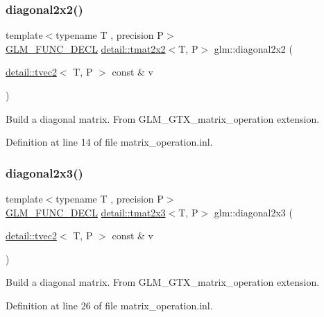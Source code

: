 \subsubsection{\texorpdfstring{diagonal2x2()}{diagonal2x2()}}
{\footnotesize\ttfamily template$<$typename T , precision P$>$ \\
\hyperlink{setup_8hpp_ab2d052de21a70539923e9bcbf6e83a51}{G\+L\+M\+\_\+\+F\+U\+N\+C\+\_\+\+D\+E\+CL} \hyperlink{structglm_1_1detail_1_1tmat2x2}{detail\+::tmat2x2}$<$T, P$>$ glm\+::diagonal2x2 (\begin{DoxyParamCaption}\item[{\hyperlink{structglm_1_1detail_1_1tvec2}{detail\+::tvec2}$<$ T, P $>$ const \&}]{v }\end{DoxyParamCaption})}

Build a diagonal matrix. From G\+L\+M\+\_\+\+G\+T\+X\+\_\+matrix\+\_\+operation extension. 

Definition at line 14 of file matrix\+\_\+operation.\+inl.

\mbox{\label{group__gtx__matrix__operation_ga873468c41cb29fb84a12a866549e0136}} 
\subsubsection{\texorpdfstring{diagonal2x3()}{diagonal2x3()}}
{\footnotesize\ttfamily template$<$typename T , precision P$>$ \\
\hyperlink{setup_8hpp_ab2d052de21a70539923e9bcbf6e83a51}{G\+L\+M\+\_\+\+F\+U\+N\+C\+\_\+\+D\+E\+CL} \hyperlink{structglm_1_1detail_1_1tmat2x3}{detail\+::tmat2x3}$<$T, P$>$ glm\+::diagonal2x3 (\begin{DoxyParamCaption}\item[{\hyperlink{structglm_1_1detail_1_1tvec2}{detail\+::tvec2}$<$ T, P $>$ const \&}]{v }\end{DoxyParamCaption})}

Build a diagonal matrix. From G\+L\+M\+\_\+\+G\+T\+X\+\_\+matrix\+\_\+operation extension. 

Definition at line 26 of file matrix\+\_\+operation.\+inl.

\mbox{\label{group__gtx__matrix__operation_gaf97e094855cc3c6186b879d045f67aca}} 

